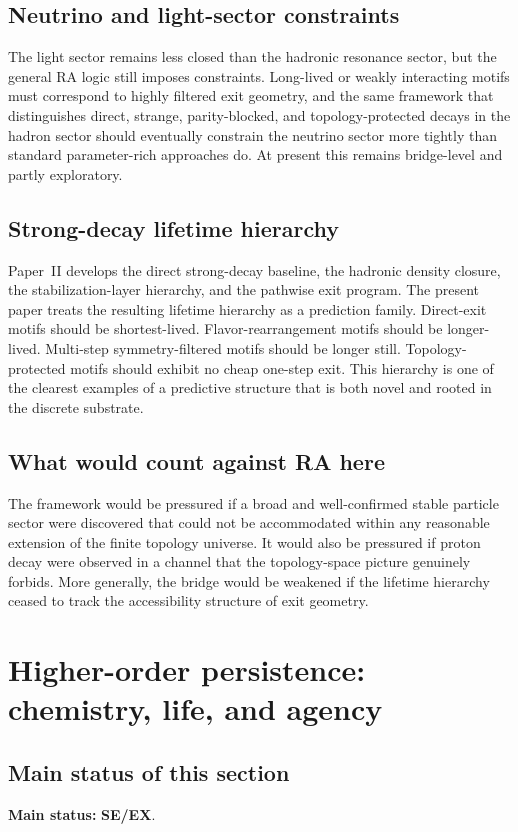 \documentclass[11pt]{article}
\begin{document}
\subsection{Neutrino and light-sector constraints}
The light sector remains less closed than the hadronic resonance sector, but the general RA logic still imposes constraints. Long-lived or weakly interacting motifs must correspond to highly filtered exit geometry, and the same framework that distinguishes direct, strange, parity-blocked, and topology-protected decays in the hadron sector should eventually constrain the neutrino sector more tightly than standard parameter-rich approaches do. At present this remains bridge-level and partly exploratory.

\subsection{Strong-decay lifetime hierarchy}
Paper~II develops the direct strong-decay baseline, the hadronic density closure, the stabilization-layer hierarchy, and the pathwise exit program. The present paper treats the resulting lifetime hierarchy as a prediction family. Direct-exit motifs should be shortest-lived. Flavor-rearrangement motifs should be longer-lived. Multi-step symmetry-filtered motifs should be longer still. Topology-protected motifs should exhibit no cheap one-step exit. This hierarchy is one of the clearest examples of a predictive structure that is both novel and rooted in the discrete substrate.

\subsection{What would count against RA here}
The framework would be pressured if a broad and well-confirmed stable particle sector were discovered that could not be accommodated within any reasonable extension of the finite topology universe. It would also be pressured if proton decay were observed in a channel that the topology-space picture genuinely forbids. More generally, the bridge would be weakened if the lifetime hierarchy ceased to track the accessibility structure of exit geometry.

\section{Higher-order persistence: chemistry, life, and agency}\label{sec:higher-order}
\subsection{Main status of this section}
\textbf{Main status:} \textbf{SE/EX}.
\end{document}
